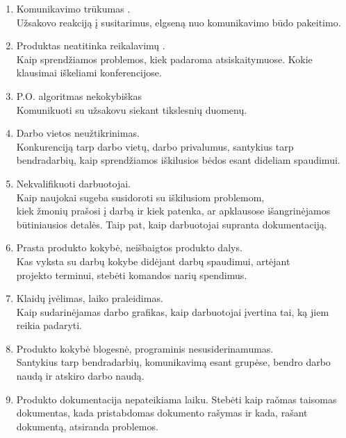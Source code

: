 \documentclass[a4paper,12pt]{article}
\begin{document}
\begin{enumerate}
	\item Komunikavimo tr\= ukumas . \\
 		U\v zsakovo reakcij\k a \k i susitarimus, elgsen\k a nuo komunikavimo b\= udo pakeitimo. 
  		
	\item Produktas neatitinka reikalavim\k u . \\
		Kaip sprend\v ziamos problemos, kiek padaroma atsiskaitymuose. Kokie klausimai i\v skeliami konferencijose.
		
	\item P.O. algoritmas nekokybiškas\\
  	Komunikuoti su užsakovu siekant tikslesnių duomenų.
  		
	\item Darbo vietos neu\v ztikrinimas.\\
  		Konkurencij\k a tarp darbo viet\k u, darbo privalumus, santykius tarp bendradarbi\k u,
  		kaip sprend\v ziamos i\v skilusios b\. edos esant dideliam spaudimui.
  		
	\item Nekvalifikuoti darbuotojai. \\
  		Kaip naujokai sugeba susidoroti su i\v skilusiom problemom, \\ kiek \v zmoni\k u
  		pra\v sosi \k i darb\k a ir kiek patenka, ar apklausose i\v sangrin\. ejamos
  		būtiniausios detal\. es. Taip pat, kaip  darbuotojai supranta dokumentacij\k a.

	\item Prasta produkto kokybė, nei\v sbaigtos produkto dalys.\\
		Kas vyksta su darb\k u kokybe did\. ejant darb\k u spaudimui, art\. ejant \\
		projekto terminui, steb\. eti komandos nari\k u spendimus.
  		
	\item Klaid\k u \k iv\. elimas, laiko praleidimas.\\
  		Kaip sudarin\. ejamas darbo grafikas, kaip darbuotojai \k ivertina tai, k\k a jiem
  		reikia padaryti.
  		
	\item Produkto kokybė blogesn\. e,	programinis nesusiderinamumas. \\ 
  		Santykius tarp bendradarbi\k u, komunikavim\k a esant grup\. ese, bendro darbo 
  		naud\k a ir atskiro darbo naud\k a.
  		
	\item Produkto dokumentacija nepateikiama laiku.
  		Steb\. eti kaip ra\v omas taisomas dokumentas, kada pristabdomas dokumento ra\v symas
  		ir kada, ra\v sant dokument\k a, atsiranda problemos.

	
  		
\end{enumerate}
\end{document}
